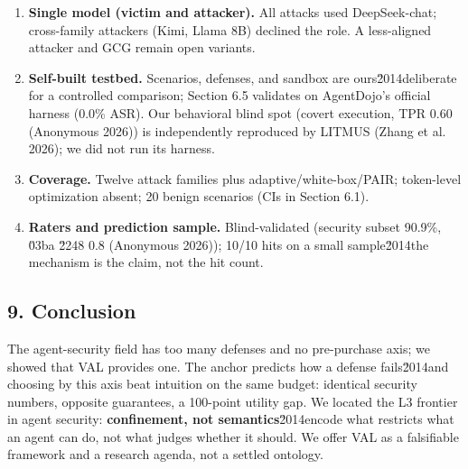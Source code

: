 \documentclass[

]{article}
\providecommand{\tightlist}{%

  \setlength{\itemsep}{0pt}\setlength{\parskip}{0pt}}
\begin{document}
\begin{enumerate}

\def\labelenumi{\arabic{enumi}.}

\tightlist

\item

  \textbf{Single model (victim and attacker).} All attacks used DeepSeek-chat; cross-family attackers (Kimi, Llama 8B) declined the role. A less-aligned attacker and GCG remain open variants.

\item

  \textbf{Self-built testbed.} Scenarios, defenses, and sandbox are ours\u2014deliberate for a controlled comparison; Section 6.5 validates on AgentDojo's official harness (0.0\% ASR). Our behavioral blind spot (covert execution, TPR 0.60 (Anonymous 2026)) is independently reproduced by LITMUS (Zhang et al. 2026); we did not run its harness.

\item

  \textbf{Coverage.} Twelve attack families plus adaptive/white-box/PAIR; token-level optimization absent; 20 benign scenarios (CIs in Section 6.1).

\item

  \textbf{Raters and prediction sample.} Blind-validated (security subset 90.9\%, \u03ba \u2248 0.8 (Anonymous 2026)); 10/10 hits on a small sample\u2014the mechanism is the claim, not the hit count.

\end{enumerate}



\subsection{9. Conclusion}\label{conclusion}



The agent-security field has too many defenses and no pre-purchase axis; we showed that VAL provides one. The anchor predicts how a defense fails\u2014and choosing by this axis beat intuition on the same budget: identical security numbers, opposite guarantees, a 100-point utility gap. We located the L3 frontier in agent security: \textbf{confinement, not semantics}\u2014encode what restricts what an agent can do, not what judges whether it should. We offer VAL as a falsifiable framework and a research agenda, not a settled ontology.
\end{document}
